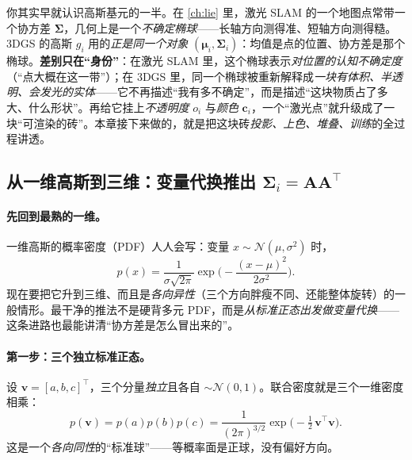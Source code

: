 \begin{insight}[一个 LiDAR-native 的入口：高斯 $=$ 带不确定椭球的点，再加“可渲染”]
你其实早就认识高斯基元的一半。在 \cref{ch:lie} 里，激光 SLAM 的一个地图点常带一个协方差 $\boldsymbol\Sigma$，几何上是一个\emph{不确定椭球}——长轴方向测得准、短轴方向测得糙。3DGS 的高斯 $g_i$ 用的\emph{正是同一个对象} $(\boldsymbol\mu_i,\boldsymbol\Sigma_i)$：均值是点的位置、协方差是那个椭球。\textbf{差别只在“身份”}：在激光 SLAM 里，这个椭球表示\emph{对位置的认知不确定度}（“点大概在这一带”）；在 3DGS 里，同一个椭球被重新解释成\emph{一块有体积、半透明、会发光的实体}——它不再描述“我有多不确定”，而是描述“这块物质占了多大、什么形状”。再给它挂上\emph{不透明度} $o_i$ 与\emph{颜色} $\mathbf c_i$，一个“激光点”就升级成了一块“可渲染的砖”。本章接下来做的，就是把这块砖\emph{投影、上色、堆叠、训练}的全过程讲透。
\end{insight}

\subsection{从一维高斯到三维：变量代换推出 $\boldsymbol\Sigma_i=\mathbf A\mathbf A^\top$}

\paragraph{先回到最熟的一维。}
一维高斯的概率密度（PDF）人人会写：变量 $x\sim\mathcal N(\mu,\sigma^2)$ 时，
\begin{equation}
  p(x)=\frac{1}{\sigma\sqrt{2\pi}}\exp\!\Big(-\frac{(x-\mu)^2}{2\sigma^2}\Big).
  \label{eq:3dgs-1d}
\end{equation}
现在要把它升到三维、而且是\emph{各向异性}（三个方向胖瘦不同、还能整体旋转）的一般情形。最干净的推法不是硬背多元 PDF，而是\emph{从标准正态出发做变量代换}——这条进路也最能讲清“协方差是怎么冒出来的”。

\paragraph{第一步：三个独立标准正态。}
设 $\mathbf v=[a,b,c]^\top$，三个分量\emph{独立}且各自 $\sim\mathcal N(0,1)$。联合密度就是三个一维密度相乘：
\begin{equation}
  p(\mathbf v)=p(a)p(b)p(c)=\frac{1}{(2\pi)^{3/2}}\exp\!\Big(-\tfrac12\,\mathbf v^\top\mathbf v\Big).
  \label{eq:3dgs-std3d}
\end{equation}
这是一个\emph{各向同性}的“标准球”——等概率面是正球，没有偏好方向。

